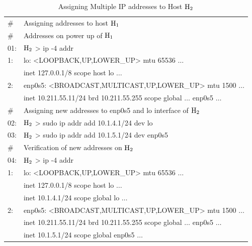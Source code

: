\begin{table}[H]
\caption{Assigning Multiple IP addresses to Host ${\rm H}_{2}$}\label{chap2-table-5}
\begin{center}
\begin{tabular}{|l@{\;}p{11.3cm}|}
\hline
\# & Assigning addresses to host ${\rm H}_{1}$\\
\# & Addresses on power up of ${\rm H}_{1}$\\
01:& ${\rm H}_{2}$ > ip -4 addr\\
1: & lo: <LOOPBACK,UP,LOWER\_UP> mtu 65536 $\ldots$\\
    &\quad inet 127.0.0.1/8 scope host lo $\ldots$\\
2: & enp0s5: <BROADCAST,MULTICAST,UP,LOWER\_UP> mtu 1500 $\ldots$\\
   & \quad inet 10.211.55.11/24 brd 10.211.55.255 scope global $\ldots$ enp0s5 $\ldots$\\
    \hline
\# & Assigning new addresses to enp0s5 and lo interface of ${\rm H}_{2}$\\
02: & ${\rm H}_{2}$ > sudo ip addr add 10.1.4.1/24 dev lo\\
03: & ${\rm H}_{2}$ > sudo ip addr add 10.1.5.1/24 dev enp0s5\\
\hline
\# & Verification of new addresses on ${\rm H}_{2}$\\
04:& ${\rm H}_{2}$ > ip -4 addr\\
1:& lo: <LOOPBACK,UP,LOWER\_UP> mtu 65536 $\ldots$\\
   & \quad inet 127.0.0.1/8 scope host lo $\dots$\\
   &  \quad inet 10.1.4.1/24 scope global lo $\ldots$\\
2:& enp0s5: <BROADCAST,MULTICAST,UP,LOWER\_UP> mtu 1500 $\ldots$\\
   & \quad inet 10.211.55.11/24 brd 10.211.55.255 scope global $\ldots$ enp0s5 $\ldots$\\
   & \quad inet 10.1.5.1/24 scope global enp0s5 $\ldots$\\
   \hline
\end{tabular}
\end{center}
\end{table}

\vspace{-.9cm}


